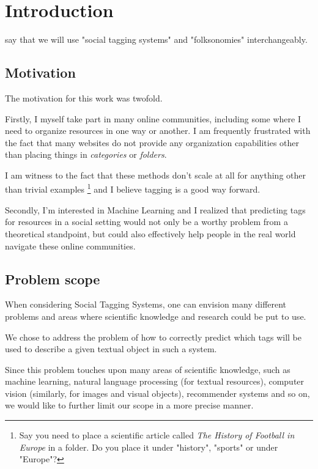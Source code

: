 \chapter{Introduction}\label{chap:intro}

say that we will use "social tagging systems" and "folksonomies" interchangeably.

\section{Motivation}\label{section:intro_motivation}

The motivation for this work was twofold. 

Firstly, I myself take part in many online communities, including some where I need to organize resources in one way or another. I am frequently frustrated with the fact that many websites do not provide any organization capabilities other than placing things in \textit{categories} or \textit{folders}.

I am witness to the fact that these methods don't scale at all for anything other than trivial examples \footnote{Say you need to place a scientific article called \textit{The History of Football in Europe} in a folder. Do you place it under "history", "sports" or under "Europe"?} and I believe tagging is a good way forward.

Secondly, I'm interested in Machine Learning and I realized that predicting tags for resources in a social setting would not only be a worthy problem from a theoretical standpoint, but could also effectively help people in the real world navigate these online communities.



\section{Problem scope}\label{section:intro_problem}

When considering Social Tagging Systems, one can envision many different problems and areas where scientific knowledge and research could be put to use.

We chose to address the problem of how to correctly predict which tags will be used to describe a given textual object in such a system. 

Since this problem touches upon many areas of scientific knowledge, such as machine learning, natural language processing (for textual resources), computer vision (similarly, for images and visual objects), recommender systems and so on, we would like to further limit our scope in a more precise manner.

